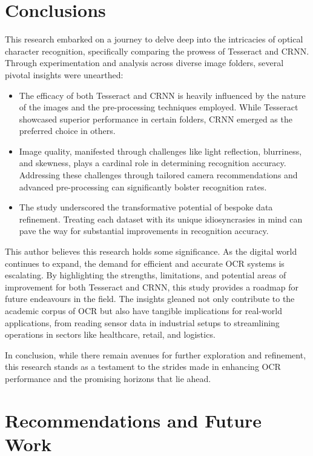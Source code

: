 \newpage

\section{Conclusions}

This research embarked on a journey to delve deep into the intricacies of optical character recognition, specifically comparing the prowess of Tesseract and CRNN. Through experimentation and analysis across diverse image folders, several pivotal insights were unearthed:

\begin{itemize}
    \item The efficacy of both Tesseract and CRNN is heavily influenced by the nature of the images and the pre-processing techniques employed. While Tesseract showcased superior performance in certain folders, CRNN emerged as the preferred choice in others.
    \item Image quality, manifested through challenges like light reflection, blurriness, and skewness, plays a cardinal role in determining recognition accuracy. Addressing these challenges through tailored camera recommendations and advanced pre-processing can significantly bolster recognition rates.
    \item The study underscored the transformative potential of bespoke data refinement. Treating each dataset with its unique idiosyncrasies in mind can pave the way for substantial improvements in recognition accuracy.
\end{itemize}

This author believes this research holds some significance. As the digital world continues to expand, the demand for efficient and accurate OCR systems is escalating. By highlighting the strengths, limitations, and potential areas of improvement for both Tesseract and CRNN, this study provides a roadmap for future endeavours in the field. The insights gleaned not only contribute to the academic corpus of OCR but also have tangible implications for real-world applications, from reading sensor data in industrial setups to streamlining operations in sectors like healthcare, retail, and logistics.

In conclusion, while there remain avenues for further exploration and refinement, this research stands as a testament to the strides made in enhancing OCR performance and the promising horizons that lie ahead.



\section{Recommendations and Future Work}

